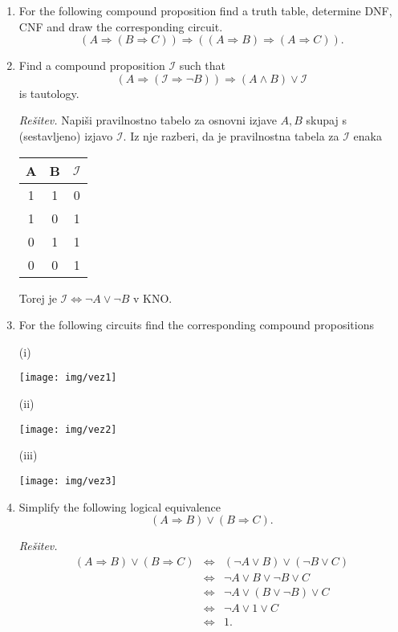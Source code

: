\documentclass[11pt,paper=b5,footinclude,headinclude]{scrbook} %
\theoremstyle{remark}
\theoremstyle{definition} %
\theoremstyle{theorem} %
\begin{document}
\begin{enumerate}
\item For the following compound proposition find  a truth table, determine DNF, CNF and draw the corresponding circuit.
$$
(A \Rightarrow (B\Rightarrow C)) \Rightarrow ((A\Rightarrow B)\Rightarrow (A \Rightarrow C)).
$$


\item Find a compound proposition $\mathcal{I}$ such that
$$(A\Rightarrow (\mathcal{I} \Rightarrow \neg B))\Rightarrow (A\wedge B) \vee \mathcal{I}$$
is tautology.

\emph{Rešitev.} Napiši pravilnostno tabelo za osnovni izjave $A, B$ skupaj s (sestavljeno) izjavo $\mathcal{I}$. Iz nje razberi, da je pravilnostna tabela za $\mathcal{I}$ enaka
\begin{table}[ht!]
\centering
\begin{tabular}{c|c|c}
A & B & $\mathcal{I}$\\
\hline
1 & 1 & 0\\
1 & 0 & 1\\
0 & 1 & 1\\
0 & 0 & 1
\end{tabular}
\end{table}

Torej je $\mathcal{I} \Leftrightarrow \neg A \vee \neg B$ v KNO.
\pagebreak

\item For the following circuits find the  corresponding compound propositions

\noindent (i)
\begin{center}
\texttt{[image: img/vez1]}
\end{center}
\noindent (ii)
\begin{center}
\texttt{[image: img/vez2]}
\end{center}
\noindent (iii)
\begin{center}
\texttt{[image: img/vez3]}
\end{center}




\item Simplify the following logical equivalence
$$(A\Rightarrow B) \vee (B \Rightarrow C).$$

\emph{Rešitev.} 
\begin{eqnarray*}
(A\Rightarrow B) \vee (B \Rightarrow C) &\Leftrightarrow & (\neg A \vee B) \vee (\neg B \vee C)\\
&\Leftrightarrow & \neg A \vee B \vee \neg B \vee C\\
&\Leftrightarrow & \neg A \vee (B \vee \neg B) \vee C\\
&\Leftrightarrow & \neg A \vee 1 \vee C\\
&\Leftrightarrow & 1.
\end{eqnarray*}


\end{enumerate}
\end{document}
